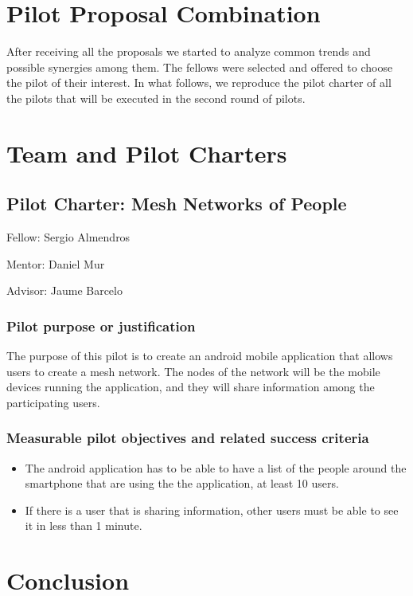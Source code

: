 \documentclass[draftclsnofoot,12pt,journal,onecolumn]{IEEEtran}
\begin{document}
\section{Pilot Proposal Combination}
\label{sec:merging}

After receiving all the proposals we started to analyze common trends and possible synergies among them.
The fellows were selected and offered to choose the pilot of their interest.
In what follows, we reproduce the pilot charter of all the pilots that will be executed in the second round of pilots.

\section{Team and Pilot Charters}
\label{sec:charters}

\subsection{Pilot Charter: Mesh Networks of People}
\label{sec:mnp}

Fellow: Sergio Almendros

Mentor: Daniel Mur

Advisor: Jaume Barcelo

\subsubsection{Pilot purpose or justification}
The purpose of this pilot is to create an android mobile application that allows users to create a mesh network.
The nodes of the network will be the mobile devices running the application, and they will share information among the participating users.

\subsubsection{Measurable pilot objectives and related success criteria}
\begin{itemize}
\item The android application has to be able to have a list of the people around the smartphone that are using the the application, at least 10 users.
\item If there is a user that is sharing information, other users must be able to see it in less than 1 minute.
\end{itemize}



\section{Conclusion}
\label{sec:conclusion}
\end{document}

